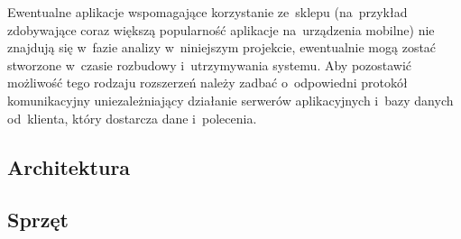 Ewentualne aplikacje wspomagające korzystanie ze~sklepu (na~przykład zdobywające coraz większą popularność aplikacje na~urządzenia mobilne) nie znajdują się w~fazie analizy w~niniejszym projekcie, ewentualnie mogą zostać stworzone w~czasie rozbudowy i~utrzymywania systemu. Aby pozostawić możliwość tego rodzaju rozszerzeń należy zadbać o~odpowiedni protokół komunikacyjny uniezależniający działanie serwerów aplikacyjnych i~bazy danych od~klienta, który dostarcza dane i~polecenia.

\subsection{Architektura}

\subsection{Sprzęt}

